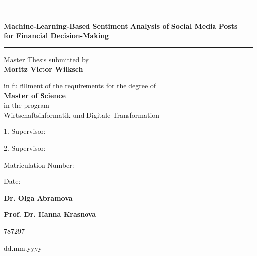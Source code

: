 \begin{titlepage}
\begin{center}
			\vspace*{2cm}
	
				\begin{center}
						\rule{\textwidth}{0.5pt}\\			%
						\vspace*{0.5cm}
						\doublespacing 
						\large{\textbf{
									Machine-Learning-Based Sentiment Analysis of Social Media Posts\\
									for Financial Decision-Making
									}}
						\vspace*{0.5cm} 
						\rule{\textwidth}{0.5pt}			%
						        
						\normalsize	\vspace*{0.25cm} 
						
									Master Thesis submitted by \\
									\textbf{Moritz Victor Wilksch}
									
						 			 in fulfillment of the requirements for the degree of\\
						 			\textbf{ Master of Science} \\ 
						 			in the program \\
						 			Wirtschaftsinformatik und Digitale Transformation
					\end{center}    
					

			\vfill
			
			

				\begin{minipage}[t]{14cm}
							\begin{minipage}[t]{5.5cm}
									1. Supervisor: 
									
									2. Supervisor:\vspace*{0.5cm} 
									
									Matriculation Number:
									
									Date:
									
							\end{minipage}
							\begin{minipage}[t]{8cm} 
									\textbf{Dr. Olga Abramova}
									
									\textbf{Prof. Dr. Hanna Krasnova} \vspace*{0.5cm}
									
									787297
									
									dd.mm.yyyy
							\end{minipage} 
				\end{minipage}

			\vspace*{1cm}
	\end{center}
\end{titlepage}
